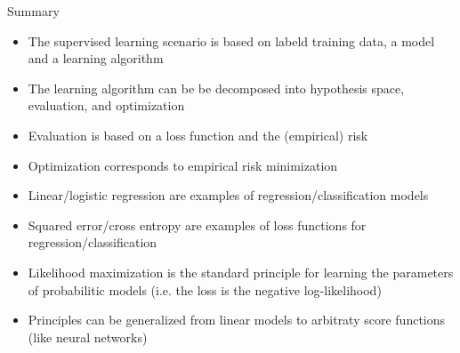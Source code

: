 \begin{frame}{Summary}
\begin{itemize}
\item The supervised learning scenario is based on labeld training data, a model and a learning algorithm
\item The learning algorithm can be be decomposed into hypothesis space, evaluation, and optimization
\item Evaluation is based on a loss function and  the (empirical) risk
\item Optimization corresponds to empirical risk minimization
\item Linear/logistic regression are examples of regression/classification models 
\item Squared error/cross entropy are examples of loss functions for regression/classification 
\item Likelihood maximization is the standard principle for learning the parameters of probabilitic models (i.e. the loss is the negative log-likelihood)
\item Principles can be generalized from linear models to arbitraty score functions (like neural networks)
\end{itemize}
\end{frame}


\endlecture
